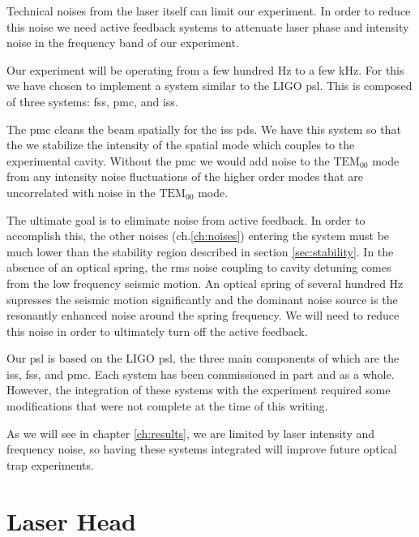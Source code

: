 \acresetall

Technical noises from the laser itself can limit our experiment. \cite{Corbitt07}
In order to reduce this noise we need active feedback systems to attenuate laser
phase and intensity noise in the frequency band of our experiment.

Our experiment will be operating from a few hundred Hz to a few kHz.
For this we have chosen to implement a system similar to the LIGO \ac{psl}.
This is composed of three systems: \ac{fss}, \ac{pmc}, and \ac{iss}.

The \ac{pmc} cleans the beam spatially for the \ac{iss} \ac{pd}s.
We have this system so that the we stabilize the intensity of the spatial mode
which couples to the experimental cavity.
Without the \ac{pmc} we would add noise to the $\mathrm{TEM}_{00}$ mode from any
intensity noise fluctuations of the higher order modes that are uncorrelated
with noise in the $\mathrm{TEM}_{00}$ mode.

The ultimate goal is to eliminate noise from active feedback.
In order to accomplish this, the other noises
(ch.\ref{ch:noises}) entering the system must be much lower than the stability
region described in section \ref{sec:stability}.
In the absence of an optical spring, the rms noise coupling to cavity detuning
comes from the low frequency seismic motion.
An optical spring of several hundred Hz supresses the seismic motion
significantly and the dominant noise source is the resonantly enhanced noise
around the spring frequency.
We will need to reduce this noise in order to ultimately turn off the active
feedback.

Our \ac{psl} is based on the LIGO \ac{psl}, the three main components of which
are the \ac{iss}, \ac{fss}, and \ac{pmc}. Each system has been commissioned in
part and as a whole. However, the integration of these systems with the
experiment required some modifications that were not complete at the time of
this writing.

As we will see in chapter \ref{ch:results}, we are limited by laser intensity
and frequency noise, so having these systems integrated will improve
future optical trap experiments.


\section{Laser Head}


